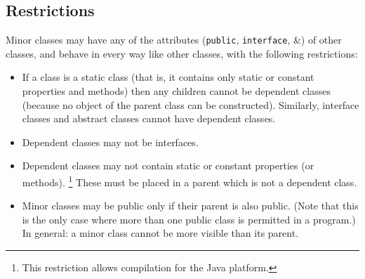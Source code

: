 \subsection{Restrictions}\label{"id"}
 
Minor classes may have any of the attributes (\texttt{public},
\texttt{interface}, \&) of other classes, and behave in every way
like other classes, with the following restrictions:
\begin{itemize}
\item 
If a class is a static class (that is, it contains only static or
constant properties and methods) then any children cannot be dependent
classes (because no object of the parent class can be constructed).
Similarly, interface classes and abstract classes cannot have dependent
classes.
\item 
Dependent classes may not be interfaces.
\item 
{}
Dependent classes may not contain static or constant properties (or
methods).
\footnote{
This restriction allows compilation for the Java platform.
}
These must be placed in a parent which is not a dependent class.
\item 
Minor classes may be public only if their parent is also public.
(Note that this is the only case where more than one public class is
permitted in a program.)  In general: a minor class cannot be more
visible than its parent.
\end{itemize}
\index{,}
\index{,}
